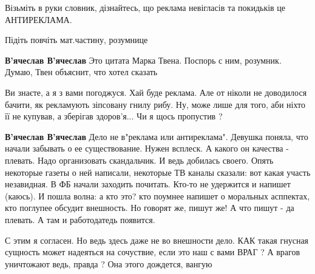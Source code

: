 \begin{itemize}
\begin{itemize}
Візьміть в руки словник, дізнайтесь, що реклама невігласів та покидьків це
АНТИРЕКЛАМА.

Підіть повчіть мат.частину, розумнице
🤣

 
\textbf{В'ячеслав В'ячеслав} Это цитата Марка Твена. Поспорь с ним, розумник. Думаю, Твен объяснит, что хотел сказать

 
Ви знаєте, а я з вами погоджуся. Хай буде реклама.
Але от ніколи не доводилося бачити, як рекламують зіпсовану гнилу рибу.
Ну, може лише для того, аби ніхто її не купував, а зберігав здоров'я...
Чи я щось пропустив ?
🤔

 
\textbf{В'ячеслав В'ячеслав} Дело не в"реклама или антиреклама". Девушка
поняла, что начали забывать о ее существование. Нужен всплеск. А какого он
качества - плевать. Надо организовать скандальчик. И ведь добилась своего.
Опять некоторые газеты о ней написали, некоторые ТВ каналы сказали: вот какая
участь незавидная. В ФБ начали заходить почитать. Кто-то не удержится и напишет
(каюсь). И пошла волна: а кто это? кто поумнее напишет о моральных асппектах,
кто поглупее обсудит внешность. Но говорят же, пишут же! А что пишут - да
плевать. А там и работодатедь появится.

 
С этим я согласен.
Но ведь здесь даже не во внешности дело.
КАК такая гнусная сущность может надеяться на сочуствие, если это наш с вами ВРАГ ?
А врагов уничтожают ведь, правда ?
Она этого дождется, вангую


\end{itemize}
\end{itemize}
